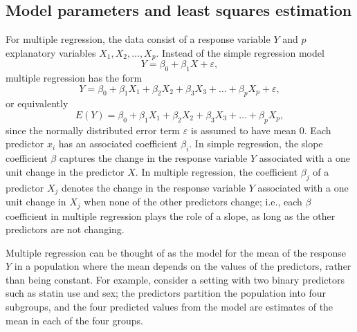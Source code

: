 \subsection{Model parameters and least squares estimation}
 
For multiple regression, the data consist of a response variable $Y$ and $p$ explanatory variables $X_1, X_2,\ldots, X_p$.   Instead of the simple regression model 
 $${Y} = \beta_{0} + \beta_{1}X + {\varepsilon},$$
 multiple regression has the form
 $${Y} = \beta_{0} +
     \beta_{1}X_{1} + \beta_{2}X_{2} + \beta_{3}X_{3} + \dots +
     \beta_{p}X_{p} + \varepsilon,$$
or equivalently
 $$E(Y) = \beta_{0} + 
     \beta_{1}X_{1} + \beta_{2}X_{2} + \beta_{3}X_{3} + \dots +
     \beta_{p}X_{p},
	 \label{multipleRegressionModel}
	 $$ 
since the normally distributed error term $\varepsilon$ is assumed to have mean 0. Each predictor $x_i$ has an associated coefficient $\beta_i$.  In simple regression, the slope coefficient $\beta$ captures the change in the response variable $Y$ associated with a one unit change in the predictor $X$.  In multiple regression, the coefficient $\beta_j$ of a predictor $X_j$ denotes the change in the response variable $Y$ associated with a one unit change in $X_j$ when none of the other predictors change; i.e., each $\beta$ coefficient in multiple regression plays the role of a slope, as long as the other predictors are not changing.

Multiple regression can be thought of as the model for the mean of the response $Y$ in a population where the mean depends on the values of the predictors, rather than being constant. For example, consider a setting with two binary predictors such as statin use and sex; the predictors partition the population into four subgroups, and the four predicted values from the model are estimates of the mean in each of the four groups.

